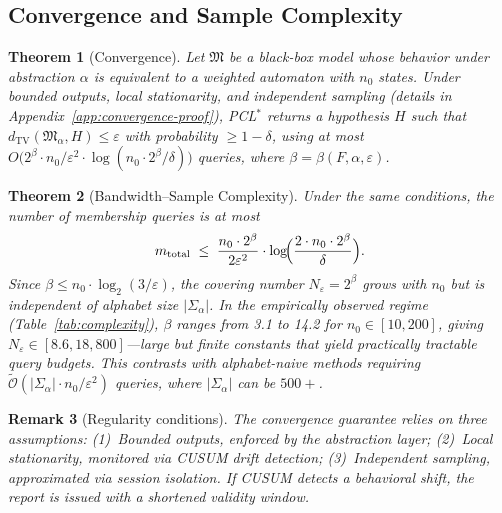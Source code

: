 \documentclass[11pt]{article}
\newtheorem{theorem}{Theorem}[section]
\newtheorem{remark}[theorem]{Remark}
\newcommand{\pclstar}{PCL$^*$}
\newcommand{\Otil}{\tilde{\mathcal{O}}}
\begin{document}
\subsection{Convergence and Sample Complexity}

\begin{theorem}[Convergence]\label{thm:convergence}
Let $\mathfrak{M}$ be a black-box model whose behavior under
abstraction $\alpha$ is equivalent to a weighted automaton with $n_0$
states.  Under bounded outputs, local stationarity, and independent
sampling (details in Appendix~\ref{app:convergence-proof}),
\pclstar{} returns a hypothesis $H$ such that
$d_{\mathrm{TV}}(\mathfrak{M}_\alpha, H) \le \varepsilon$ with
probability $\ge 1 - \delta$, using at most
$O\!\bigl(2^{\beta} \cdot n_0 / \varepsilon^2 \cdot \log(n_0 \cdot 2^\beta/\delta)\bigr)$
queries, where $\beta = \beta(F, \alpha, \varepsilon)$.
\end{theorem}

\begin{theorem}[Bandwidth--Sample Complexity]\label{thm:bandwidth-sample}
Under the same conditions, the number of membership queries is at most
\begin{equation}\label{eq:sample-complexity}
  m_{\mathrm{total}} \;\le\;
  \frac{n_0 \cdot 2^{\beta}}{2\varepsilon^2}
  \cdot \log\!\Bigl(\frac{2 \cdot n_0 \cdot 2^{\beta}}{\delta}\Bigr).
\end{equation}
Since $\beta \le n_0 \cdot \log_2(3/\varepsilon)$, the covering
number $N_\varepsilon = 2^\beta$ grows with $n_0$ but is
\emph{independent of alphabet size} $|\Sigma_\alpha|$.  In the
empirically observed regime (Table~\ref{tab:complexity}), $\beta$
ranges from 3.1 to 14.2 for $n_0 \in [10, 200]$, giving
$N_\varepsilon \in [8.6, 18{,}800]$---large but finite constants
that yield practically tractable query budgets.  This contrasts with
alphabet-naive methods requiring
$\Otil(|\Sigma_\alpha| \cdot n_0 / \varepsilon^2)$ queries, where
$|\Sigma_\alpha|$ can be $500{+}$.
\end{theorem}

\begin{remark}[Regularity conditions]
The convergence guarantee relies on three assumptions:
(1)~\emph{Bounded outputs}, enforced by the abstraction layer;
(2)~\emph{Local stationarity}, monitored via CUSUM drift detection;
(3)~\emph{Independent sampling}, approximated via session isolation.
If CUSUM detects a behavioral shift, the report is issued with
a shortened validity window.
\end{remark}
\end{document}
